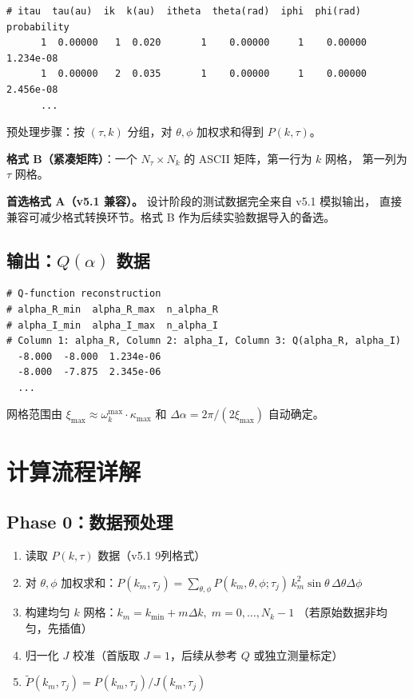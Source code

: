 \documentclass[11pt,a4paper]{ctexart}
\begin{document}
\begin{lstlisting}[caption=v5.1 probability\_tau.dat 格式（9列）, label=lst:input]
# itau  tau(au)  ik  k(au)  itheta  theta(rad)  iphi  phi(rad)  probability
      1  0.00000   1  0.020       1    0.00000     1    0.00000    1.234e-08
      1  0.00000   2  0.035       1    0.00000     1    0.00000    2.456e-08
      ...
\end{lstlisting}

预处理步骤：按 $(\tau, k)$ 分组，对 $\theta,\phi$ 加权求和得到 $P(k,\tau)$。

\textbf{格式 B（紧凑矩阵）}：一个 $N_\tau \times N_k$ 的 ASCII 矩阵，第一行为 $k$ 网格，
第一列为 $\tau$ 网格。

\begin{designbox}
\textbf{首选格式 A（v5.1 兼容）。} 设计阶段的测试数据完全来自 v5.1 模拟输出，
直接兼容可减少格式转换环节。格式 B 作为后续实验数据导入的备选。
\end{designbox}

\subsection{输出：$Q(\alpha)$ 数据}

\begin{lstlisting}[caption=Q 函数输出格式, label=lst:output]
# Q-function reconstruction
# alpha_R_min  alpha_R_max  n_alpha_R
# alpha_I_min  alpha_I_max  n_alpha_I
# Column 1: alpha_R, Column 2: alpha_I, Column 3: Q(alpha_R, alpha_I)
  -8.000  -8.000  1.234e-06
  -8.000  -7.875  2.345e-06
  ...
\end{lstlisting}

网格范围由 $\xi_{\max} \approx \omega_k^{\max} \cdot \kappa_{\max}$ 和
$\Delta\alpha = 2\pi / (2\xi_{\max})$ 自动确定。

\section{计算流程详解}

\subsection{Phase 0：数据预处理}

\begin{enumerate}
    \item 读取 $P(k,\tau)$ 数据（v5.1 9列格式）
    \item 对 $\theta,\phi$ 加权求和：$P(k_m,\tau_j) = \sum_{\theta,\phi}
        P(k_m,\theta,\phi;\tau_j)\,k_m^2\sin\theta\,\Delta\theta\Delta\phi$
    \item 构建均匀 $k$ 网格：$k_m = k_{\min} + m\Delta k,\; m=0,\ldots,N_k-1$
    （若原始数据非均匀，先插值）
    \item 归一化 $J$ 校准（首版取 $J=1$，后续从参考 $Q$ 或独立测量标定）
    \item $\tilde{P}(k_m,\tau_j) = P(k_m,\tau_j) / J(k_m,\tau_j)$
\end{enumerate}
\end{document}
